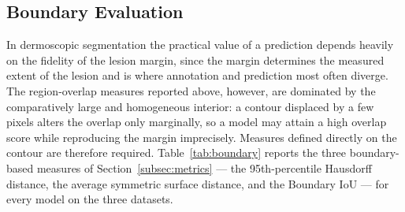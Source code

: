 \subsection{Boundary Evaluation}
\label{subsec:boundeval}

In dermoscopic segmentation the practical value of a prediction depends heavily on the fidelity of the lesion margin, since the margin determines the measured extent of the lesion and is where annotation and prediction most often diverge. The region-overlap measures reported above, however, are dominated by the comparatively large and homogeneous interior: a contour displaced by a few pixels alters the overlap only marginally, so a model may attain a high overlap score while reproducing the margin imprecisely. Measures defined directly on the contour are therefore required. Table~\ref{tab:boundary} reports the three boundary-based measures of Section~\ref{subsec:metrics} --- the 95th-percentile Hausdorff distance, the average symmetric surface distance, and the Boundary IoU --- for every model on the three datasets.

